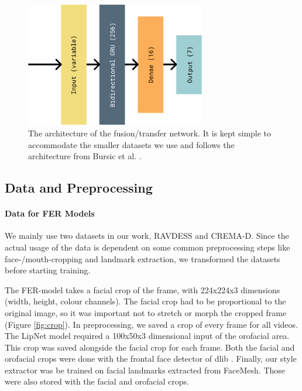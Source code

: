 \begin{figure}
    \centering
    \includegraphics[width=0.7\textwidth]{res/png_backup/fusion.png}
    \caption{The architecture of the fusion/transfer network. It is kept simple to accommodate the smaller datasets we use and follows the architecture from Bursic et al. \cite{bursic2020improving}.}
    \label{fig:fusionlayers}
\end{figure}
\subsection{Data and Preprocessing}
\paragraph{Data for FER Models}
We mainly use two datasets in our work, RAVDESS and CREMA-D. Since the actual usage of the data is dependent on some common preprocessing steps like face-/mouth-cropping and landmark extraction, we transformed the datasets before starting training.

The FER-model takes a facial crop of the frame, with 224x224x3 dimensions (width, height, colour channels). The facial crop had to be proportional to the original image, so it was important not to stretch or morph the cropped frame (Figure \ref{fig:crop}). In preprocessing, we saved a crop of every frame for all videos. 
The LipNet model required a 100x50x3 dimensional input of the orofacial area. This crop was saved alongside the facial crop for each frame. Both the facial and orofacial crops were done with the frontal face detector of dlib \cite{dlib09}. Finally, our style extractor was be trained on facial landmarks extracted from FaceMesh. Those were also stored with the facial and orofacial crops.

